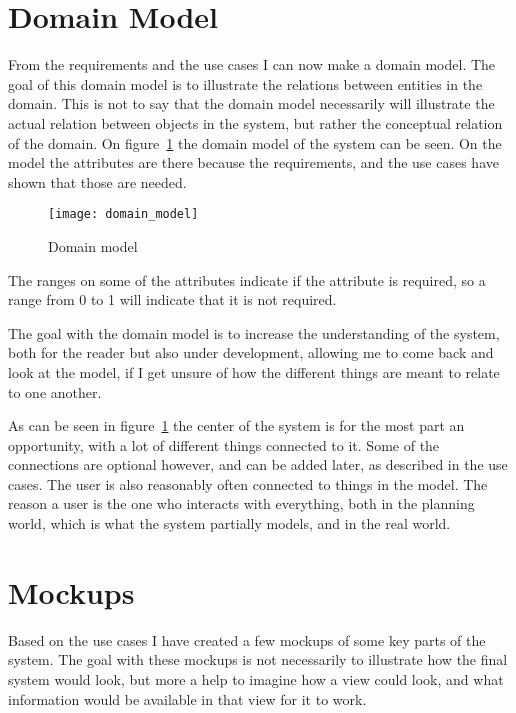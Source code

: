 \section{Domain Model}
\label{sec:Domain Model}

From the requirements and the use cases I can now make a domain model. The goal
of this domain model is to illustrate the relations between entities in the
domain\cite{larman}. This is not to say that the domain model necessarily will
illustrate the actual relation between objects in the system, but rather the
conceptual relation of the domain. On figure~\ref{fig:domain_model} the domain
model of  the system can be seen. On the model the attributes are there because
the requirements, and the use cases have shown that those are needed. 

\begin{figure}[!htb]
  \centering
  \texttt{[image: domain\_model]}
  \caption{Domain model}
\label{fig:domain_model}
\end{figure}

The ranges on some of the attributes indicate if the attribute is required, so a
range from 0 to 1 will indicate that it is not required. 

The goal with the domain model is to increase the understanding of the system,
both for the reader but also under development, allowing me to come back and
look at the model, if I get unsure of how the different things are meant to
relate to one another. 

As can be seen in figure~\ref{fig:domain_model} the center of the system is for
the most part an opportunity, with a lot of different things connected to it.
Some of the connections are optional however, and can be added later, as
described in the use cases. The user is also reasonably often connected to
things in the model. The reason a user is the one who interacts with everything,
both in the planning world, which is what the system partially models, and in
the real world.

\section{Mockups}
\label{sec:Mockups}
Based on the use cases I have created a few mockups of some key parts of
the system. The goal with these mockups is not necessarily to illustrate how
the final system would look, but more a help to imagine how a view could look,
and what information would be available in that view for it to work.


